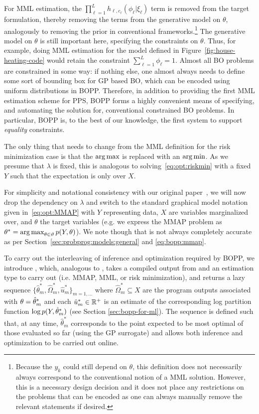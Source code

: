 For MML estimation, the $\prod_{\ell=1}^{L} h_{\ell,c_{\ell}} (\phi_{\ell} | \xi_{\ell})$
term is removed from the target formulation, thereby removing the terms from the generative
model on $\theta$, analogously to removing the prior in conventional frameworks.\footnote{Because the 
	$y_k$ could still depend on $\theta$, this definition does not necessarily always correspond to 
	the conventional notion of a MML solution.
	However, this is a necessary design decision and it does not place any restrictions on the 
	problems that can be encoded as one can always manually remove the relevant 
	\observe statements if desired.}
The generative
model on $\theta$ is still important here, specifying the constraints
on $\theta$.  Thus, for example, doing MML estimation for the model defined in 
Figure~\ref{fig:house-heating-code} would retain the constraint $\sum_{\ell=1}^{L} \phi_{\ell} = 1$.
Almost all BO problems
are constrained in some way: if nothing else, one almost always needs to define some sort of bounding
box for GP based BO, which can be encoded using uniform distributions in BOPP.   
Therefore, in addition to providing the first  MML estimation scheme for PPS, BOPP forms a highly convenient means
of specifying, and automating the solution for, conventional constrained BO problems.  In particular,
BOPP is, to the best of our knowledge, the first system to support \emph{equality} constraints.

The only thing that
needs to change from the MML definition for the risk minimization case is that the $\operatorname*{arg\,max}$ is replaced with an $\operatorname*{arg\,min}$.
As we presume that $\lambda$ is fixed, this is analogous to solving~\eqref{eq:opt:riskmin} with a fixed $Y$ such that
the expectation is only over $X$.

For simplicity and notational consistency with our original paper~\citep{rainforth2016bayesian}, 
we will now drop the dependency on $\lambda$ and switch to
the standard graphical model notation given in~\eqref{eq:opt:MMAP}
with $Y$ representing data, $X$ are variables marginalized over, and $\theta$ the target variables
(e.g. we express the MMAP problem as $\theta^* = \operatorname*{arg\,max}_{\theta \in \vartheta}
p(Y,\theta)$).
We note though that
is not always completely accurate as per Section~\ref{sec:probprog:models:general} and 
\eqref{eq:bopp:mmap}.

To carry out the interleaving of inference and optimization required by BOPP, we
introduce \doopt, which, analogous to \doquery, takes a compiled output from  and
an estimation type to carry out (i.e. MMAP, MML, or risk minimization), and
returns a lazy sequence $\{\hat{\theta}^*_m,\hat{\Omega}^*_m,\hat{u}^*_m\}_{m=1,\dots}$
where $\hat{\Omega}^*_m \subseteq X$ are the program outputs associated with
$\theta=\hat{\theta}^*_m$ and each $\hat{u}^*_m \in \mathbb{R}^+$ is an estimate of the corresponding
log partition function $\log p(Y, \hat{\theta}_m^*)$ (see Section \ref{sec:bopp-for-ml}).  The
sequence is
defined such that, at any time, $\hat{\theta}^*_m$ corresponds to the point expected to be
most optimal of those evaluated so far (using the GP surrogate) and allows both inference and optimization to be
carried out online.
